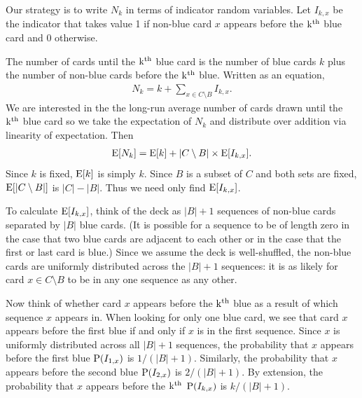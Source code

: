 Our strategy is to write $N_k$ in terms of
indicator random variables.
Let $I_{k,x}$ be the indicator that takes value 1
if non-blue card $x$ appears before the $\operatorname{k^{th}}$ blue card
and 0 otherwise.

The number of cards until the $\operatorname{k^{th}}$ blue card
is the number of blue cards $k$
plus the number of non-blue cards before the $\operatorname{k^{th}}$ blue.
Written as an equation,
\begin{align}
    N_k = k + \sum_{x \in C \setminus B} I_{k,x}. \nonumber
\end{align}
We are interested in the the long-run average number of 
cards drawn until the $\operatorname{k^{th}}$ blue card
so we take the expectation of $N_k$ and distribute
over addition via linearity of expectation.
Then
\begin{align} \label{eq:expected_card}
    \operatorname{\mathrm{E}}[N_k] = \operatorname{\mathrm{E}}[k] + |C \setminus B| \times \operatorname{\mathrm{E}}[I_{k,x}].
\end{align}
Since $k$ is fixed, $\operatorname{\mathrm{E}}[k]$ is simply $k$.
Since $B$ is a subset of $C$ and both sets are fixed,
$\operatorname{\mathrm{E}}[|C \setminus B|]$ is $|C| - |B|$.
Thus we need only find $\operatorname{\mathrm{E}}[I_{k,x}]$.

To calculate $\operatorname{\mathrm{E}}[I_{k,x}]$, think of the deck as $|B| + 1$ sequences 
of non-blue cards separated by $|B|$ blue cards.
(It is possible for a sequence to be of length zero
in the case that two blue cards are adjacent to each other or
in the case that the first or last card is blue.)
Since we assume the deck is well-shuffled, the non-blue cards
are uniformly distributed across the $|B| + 1$ sequences:
it is as likely for card $x \in C \setminus B$ to be in any one sequence
as any other.

Now think of whether card $x$ appears before the $\operatorname{k^{th}}$
blue as a result of which sequence $x$ appears in.
When looking for only one blue card,
we see that card $x$ appears before the first blue if and only if
$x$ is in the first sequence.
Since $x$ is uniformly distributed across all $|B| + 1$ sequences,
the probability that $x$ appears before the first blue $\operatorname{\mathrm{P}}(I_{1,x})$
is $1/(|B| + 1)$.
Similarly, the probability that $x$ appears before the second blue
$\operatorname{\mathrm{P}}(I_{2,x})$ is $2/(|B| + 1)$.
By extension, the probability that $x$ appears before the $\operatorname{k^{th}}$
$\operatorname{\mathrm{P}}(I_{k,x})$ is $k/(|B| + 1)$.

